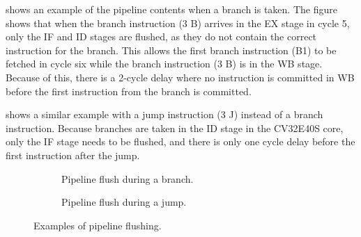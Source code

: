  shows an example of the pipeline contents when a branch is taken. The figure shows that when the branch instruction (3 B) arrives in the EX stage in cycle 5, only the IF and ID stages are flushed, as they do not contain the correct instruction for the branch. This allows the first branch instruction (B1) to be fetched in cycle six while the branch instruction (3 B) is in the WB stage. Because of this, there is a 2-cycle delay where no instruction is committed in WB before the first instruction from the branch is committed.

 shows a similar example with a jump instruction (3 J) instead of a branch instruction. Because branches are taken in the ID stage in the CV32E40S core, only the IF stage needs to be flushed, and there is only one cycle delay before the first instruction after the jump.


\begin{figure}
     \centering
     \begin{subfigure}[b]{0.48\textwidth}
        \centering
        \resizebox{1\textwidth}{!}{%
            
        }
        \caption{Pipeline flush during a branch.}
        \label{fig:branch_flush}
     \end{subfigure}
     \hfill
     \begin{subfigure}[b]{0.48\textwidth}
        \centering
        \resizebox{1\textwidth}{!}{%
            
        }
        \caption{Pipeline flush during a jump.}
        \label{fig:jump_flush}
     \end{subfigure}
     
    \caption{Examples of pipeline flushing.}
    \label{fig:flush graphs}
\end{figure}






%            
%        
%            
%            
%    




